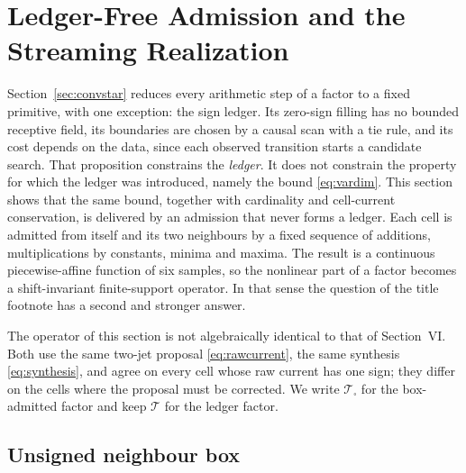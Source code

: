 \documentclass[journal]{IEEEtran}
\newcommand{\Tcal}{\mathcal{T}}
\begin{document}
\section{Ledger-Free Admission and the Streaming Realization}
\label{sec:box}

Section~\ref{sec:convstar} reduces every arithmetic step of a factor to a
fixed primitive, with one exception: the sign ledger. Its zero-sign filling
has no bounded receptive field, its boundaries are chosen by a causal scan
with a tie rule, and its cost depends on the data, since each observed
transition starts a candidate search. That proposition constrains the
\emph{ledger}. It does not constrain the property for which the ledger was
introduced, namely the bound \eqref{eq:vardim}. This section shows that the
same bound, together with cardinality and cell-current conservation, is
delivered by an admission that never forms a ledger. Each cell is admitted
from itself and its two neighbours by a fixed sequence of additions,
multiplications by constants, minima and maxima. The result is a continuous
piecewise-affine function of six samples, so the nonlinear part of a factor
becomes a shift-invariant finite-support operator. In that sense the
question of the title footnote has a second and stronger answer.

The operator of this section is not algebraically identical to that of
Section~VI. Both use the same two-jet proposal \eqref{eq:rawcurrent}, the
same synthesis \eqref{eq:synthesis}, and agree on every cell whose raw
current has one sign; they differ on the cells where the proposal must be
corrected. We write \(\Tcal_\square\) for the box-admitted factor and keep
\(\Tcal\) for the ledger factor.

\subsection{Unsigned neighbour box}
\end{document}
